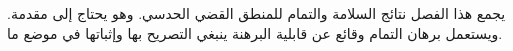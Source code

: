\documentclass[../../../include/open-logic-chapter]{subfiles}
\begin{document}

\begin{editorial}
  يجمع هذا الفصل نتائج السلامة والتمام للمنطق القضي الحدسي. وهو يحتاج إلى
  مقدمة. ويستعمل برهان التمام وقائع عن قابلية البرهنة ينبغي التصريح بها
  وإثباتها في موضع ما.
\end{editorial}


\OLEndChapterHook
\end{document}
